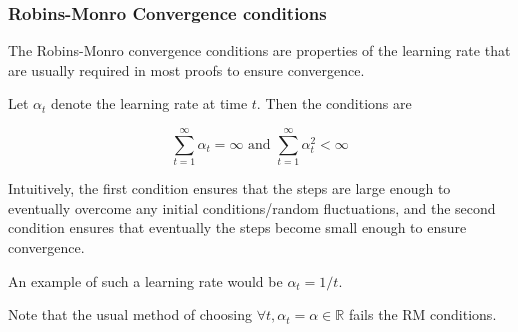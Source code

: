 \begin{frame}
\frametitle{Robins-Monro Convergence conditions}

The Robins-Monro convergence conditions are properties of the learning rate that
are usually required in most proofs to ensure convergence.

Let $\alpha_t$ denote the learning rate at time $t$. Then the conditions are

$$
\sum_{t=1}^\infty \alpha_t = \infty \text{ and } \sum_{t=1}^\infty \alpha_t^2 < \infty
$$

Intuitively, the first condition ensures that the steps are large enough to eventually overcome
any initial conditions/random fluctuations, and the second condition ensures that eventually the 
steps become small enough to ensure convergence.
\pause 

An example of such a learning rate would be $\alpha_t = 1/t$.

Note that the usual method of choosing $\forall t, \alpha_t = \alpha \in \mathbb{R}$ 
fails the RM conditions.
\end{frame}

\fi



